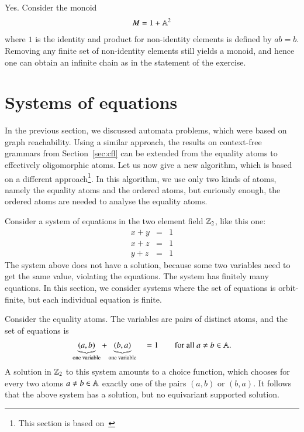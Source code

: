{
	Yes. Consider the monoid 
\begin{align*}
 M = 	1 + \mathbb A^2 
\end{align*}
where $1$ is the identity and product for non-identity elements is defined by $ab = b$. Removing any finite set of non-identity elements still yields a monoid, and hence one can obtain an infinite chain as in the statement of the exercise.
}


\section{Systems of equations}
\label{sec:equations-over-the two-element-field}
In the previous section, we discussed automata problems, which were based on graph reachability. Using a similar approach, the results on context-free grammars from Section~\ref{sec:cfl} can be extended from the equality atoms to effectively oligomorphic atoms. Let us now give a new algorithm, which is based on a different approach\footnote{This section is based on~\cite{klin2015locally}}. In this algorithm, we use only two kinds of atoms, namely the equality atoms and the ordered atoms, but curiously enough, the ordered atoms are needed to analyse the equality atoms. 

 Consider a system of equations in the two element field ${\mathbb Z}_2$, like this one:
\begin{eqnarray*}
 x + y & = & 1 \\
 x + z & = & 1 \\
 y + z & = & 1 
\end{eqnarray*}
The system above does not have a solution, because some two variables  need to get the same value, violating the equations. The system has finitely many equations. In this section, we consider systems where the set of equations is orbit-finite, but each individual equation is finite. 

\begin{myexample}
 Consider the equality atoms. The variables are pairs of distinct atoms, and the set of equations is 
 \begin{align*}
 \underbrace{(a,b)}_{\text{one variable}} + \underbrace{(b,a)}_{\text{one variable}} \quad = 1 \qquad \text{for all } a \neq b \in \mathbb A.
 \end{align*}
 A solution in ${\mathbb Z}_2$ to this system amounts to a choice function, which chooses for every two atoms $a \neq b \in \mathbb A$ exactly one of the pairs $(a,b)$ or $(b,a)$. It follows  that the above system has a solution, but no equivariant supported solution. 
\end{myexample}

